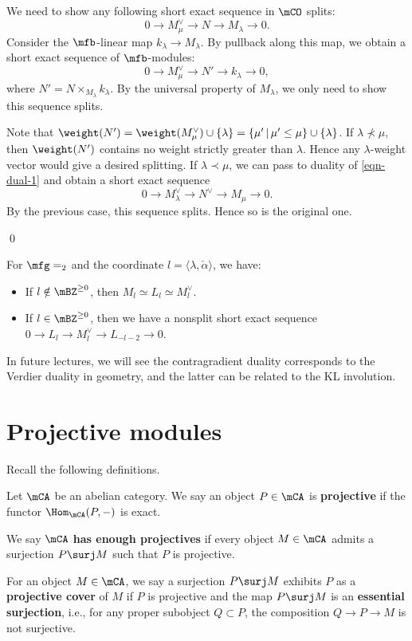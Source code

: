 	\proof
		We need to show any following short exact sequence in $\mCO$ splits:
		\begin{equation}
			\label{eqn-dual-1}
			0 \to M_\mu^\vee \to N \to M_\lambda \to 0.
		\end{equation}
		Consider the $\mfb$-linear map $k_\lambda \to M_\lambda$. By pullback along this map, we obtain a short exact sequence of $\mfb$-modules:
		\[
			0 \to M_\mu^\vee \to N' \to k_\lambda \to 0,
		\]
		where $N' = N \times_{ M_\lambda } k_\lambda$. By the universal property of $M_\lambda$, we only need to show this sequence splits. 

		Note that $\weight(N') = \weight(M_\mu^\vee)\cup \{\lambda\} = \{\mu'\,\vert\, \mu'\le \mu\}\cup \{\lambda\}$. If $\lambda\nprec \mu$, then $\weight(N')$ contains no weight strictly greater than $\lambda$. Hence any $\lambda$-weight vector would give a desired splitting. If $\lambda\prec \mu$, we can pass to duality of \eqref{eqn-dual-1} and obtain a short exact sequence
		\[
			0 \to M_\lambda^\vee \to N^\vee \to M_\mu \to 0.
		\]
		By the previous case, this sequence splits. Hence so is the original one.

	\qed

	\begin{exam}
		For $\mfg = \sl_2$ and the coordinate $l=\langle \lambda,\check\alpha\rangle$, we have:
		\begin{itemize}
			\item 
				If $l\notin \mBZ^{\ge 0}$, then $M_l \simeq L_l \simeq M_l^\vee$.
			\item
				If $l\in \mBZ^{\ge 0}$, then we have a nonsplit short exact sequence $0 \to L_l \to M_l^\vee \to L_{-l-2} \to 0$.
		\end{itemize}
	\end{exam}

	\begin{rem}
		In future lectures, we will see the contragradient duality corresponds to the Verdier duality in geometry, and the latter can be related to the KL involution.
	\end{rem}

\section{Projective modules}
	
	Recall the following definitions.

	\begin{defn}
		Let $\mCA$ be an abelian category. We say an object $P\in \mCA$ is \textbf{projective} if the functor $\Hom_\mCA(P,-)$ is exact.

		We say $\mCA$ \textbf{has enough projectives} if every object $M\in \mCA$ admits a surjection $P\surj M$ such that $P$ is projective.

		For an object $M\in \mCA$, we say a surjection $P\surj M$ exhibits $P$ as a \textbf{projective cover} of $M$ if $P$ is projective and the map $P\surj M$ is an \textbf{essential surjection}, i.e., for any proper subobject $Q\subset P$, the composition $Q\to P \to M$ is not surjective.

	\end{defn}

